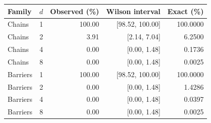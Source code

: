 \begin{tabular}{lrrrr}
\toprule
Family & $d$ & Observed (\%) & Wilson interval & Exact (\%)\\
\midrule
Chains & 1 & 100.00 & [98.52, 100.00] & 100.0000\\
Chains & 2 & 3.91 & [2.14, 7.04] & 6.2500\\
Chains & 4 & 0.00 & [0.00, 1.48] & 0.1736\\
Chains & 8 & 0.00 & [0.00, 1.48] & 0.0025\\
Barriers & 1 & 100.00 & [98.52, 100.00] & 100.0000\\
Barriers & 2 & 0.00 & [0.00, 1.48] & 1.4286\\
Barriers & 4 & 0.00 & [0.00, 1.48] & 0.0397\\
Barriers & 8 & 0.00 & [0.00, 1.48] & 0.0025\\
\bottomrule
\end{tabular}